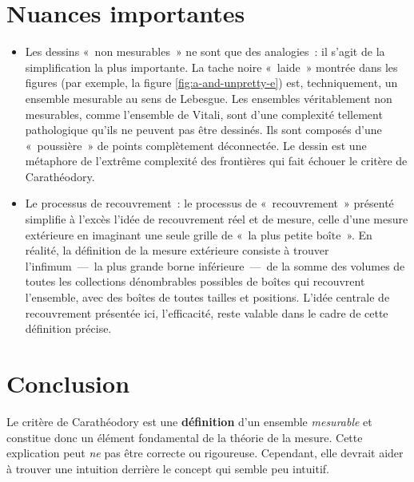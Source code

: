 \documentclass[a4paper]{article}
\begin{document}
\section{Nuances importantes}%
% 
\label{sec:Important nuances}%
\begin{itemize}
    \item 
        Les dessins « non mesurables » ne sont que des analogies : il s’agit de la simplification la plus importante. La tache noire « laide » montrée dans les figures (par exemple, la figure \ref{fig:a-and-unpretty-e}) est, techniquement, un ensemble mesurable au sens de Lebesgue. Les ensembles véritablement non mesurables, comme l’ensemble de Vitali, sont d’une complexité tellement pathologique qu’ils ne peuvent pas être dessinés. Ils sont composés d’une « poussière » de points complètement déconnectée. Le dessin est une métaphore de l’extrême complexité des frontières qui fait échouer le critère de Carathéodory.
    \item 
        Le processus de recouvrement : le processus de « recouvrement » présenté simplifie à l’excès l’idée de recouvrement réel et de mesure, celle d’une mesure extérieure en imaginant une seule grille de « la plus petite boîte ». En réalité, la définition de la mesure extérieure consiste à trouver l’infimum — la plus grande borne inférieure — de la somme des volumes de toutes les collections dénombrables possibles de boîtes qui recouvrent l’ensemble, avec des boîtes de toutes tailles et positions. L’idée centrale de recouvrement présentée ici, l’efficacité, reste valable dans le cadre de cette définition précise.
\end{itemize}%
\section{Conclusion}%
% 
\label{sec:Conclusion}
Le critère de Carathéodory est une \textbf{définition} d'un ensemble \textit{mesurable} et constitue donc un élément fondamental de la théorie de la mesure. Cette explication peut \textit{ne} pas être correcte ou rigoureuse. Cependant, elle devrait aider à trouver une intuition derrière le concept qui semble peu intuitif.%
\end{document}
